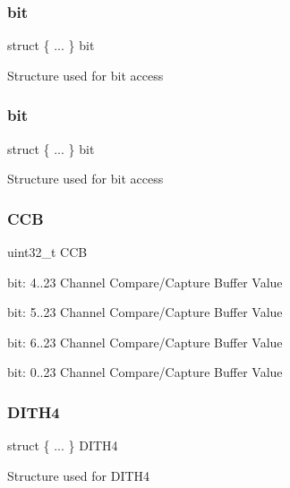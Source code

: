 \subsubsection{\texorpdfstring{bit}{bit}\hspace{0.1cm}{\footnotesize\ttfamily [1/2]}}
{\footnotesize\ttfamily struct \{ ... \}   bit}

Structure used for bit access \mbox{\label{union_t_c_c___c_c_b___type_ae2c581dac8a33a583aad061da2992462}} 
\subsubsection{\texorpdfstring{bit}{bit}\hspace{0.1cm}{\footnotesize\ttfamily [2/2]}}
{\footnotesize\ttfamily struct \{ ... \}   bit}

Structure used for bit access \mbox{\label{union_t_c_c___c_c_b___type_a01afc958e04cff1d06806b323d21d694}} 
\subsubsection{\texorpdfstring{CCB}{CCB}}
{\footnotesize\ttfamily uint32\+\_\+t C\+CB}

bit\+: 4..23 Channel Compare/\+Capture Buffer Value

bit\+: 5..23 Channel Compare/\+Capture Buffer Value

bit\+: 6..23 Channel Compare/\+Capture Buffer Value

bit\+: 0..23 Channel Compare/\+Capture Buffer Value \mbox{\label{union_t_c_c___c_c_b___type_adb6b982d5e34f35a1aae678e58da607d}} 
\subsubsection{\texorpdfstring{DITH4}{DITH4}\hspace{0.1cm}{\footnotesize\ttfamily [1/2]}}
{\footnotesize\ttfamily struct \{ ... \}   D\+I\+T\+H4}

Structure used for D\+I\+T\+H4 \mbox{\label{union_t_c_c___c_c_b___type_a11f75520ad033604b2cb42a53e9afb34}} 
